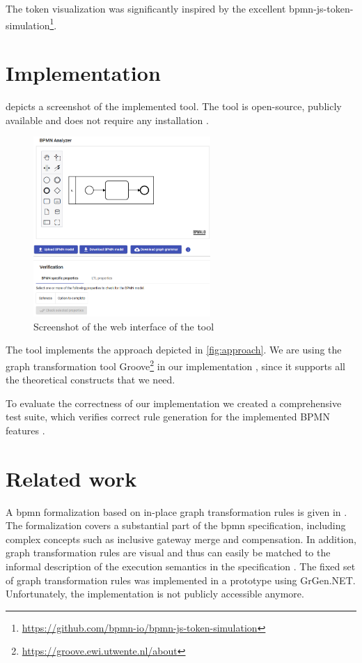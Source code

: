 \documentclass[adraft, copyright, creativecommons]{eptcs} %
\begin{document}
The token visualization was significantly inspired by the excellent bpmn-js-token-simulation\footnote{\url{https://github.com/bpmn-io/bpmn-js-token-simulation}}.
\section{Implementation} \label{sec:impl}
 depicts a screenshot of the implemented tool.
The tool is open-source, publicly available and does not require any installation \cite{timkrauterArtifactsTERMGRAPH2022}.

\begin{figure}[h]
    \centering
    \includegraphics[width=0.6\textwidth]{images/impl.png}
    \caption{Screenshot of the web interface of the tool}
    \label{fig:implScreenshot}
\end{figure}

The tool implements the approach depicted in \cref{fig:approach}.
We are using the graph transformation tool Groove\footnote{\url{https://groove.ewi.utwente.nl/about}} in our implementation \cite{ghamarianModellingAnalysisUsing2012, rensinkGROOVESimulatorTool2004}, since it supports all the theoretical constructs that we need.

To evaluate the correctness of our implementation we created a comprehensive test suite, which verifies correct rule generation for the implemented BPMN features \cite{timkrauterArtifactsTERMGRAPH2022}.
\section{Related work} \label{sec:relatedWork}
A \gls*{bpmn} formalization based on in-place graph transformation rules is given in \cite{vangorpVisualTokenbasedFormalization2013}.
The formalization covers a substantial part of the \gls*{bpmn} specification, including complex concepts such as inclusive gateway merge and compensation.
In addition, graph transformation rules are visual and thus can easily be matched to the informal description of the execution semantics in the specification \cite{objectmanagementgroupBusinessProcessModel2013}.
The fixed set of graph transformation rules was implemented in a prototype using GrGen.NET.
Unfortunately, the implementation is not publicly accessible anymore.
\end{document}

